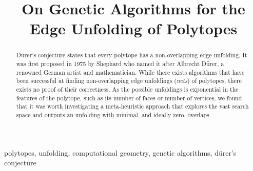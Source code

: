 \documentclass[conference]{IEEEtran}
\renewcommand{\u}{\"{u}}
\begin{document}
\title{On Genetic Algorithms for the Edge Unfolding of Polytopes}

\author{
\and
{}
\and  
{}
}

\maketitle

\begin{abstract}
    D\u rer's conjecture states that every polytope has a non-overlapping edge unfolding. It was first proposed in 1975 by Shephard who named it after Albrecht D\u rer, a renowned German artist and mathematician. While there exists algorithms that have been successful at finding non-overlapping edge unfoldings (\emph{nets}) of polytopes, there exists no proof of their correctness. As the possible unfoldings is exponential in the features of the polytope, such as its number of faces or number of vertices, we found that it was worth investigating a meta-heuristic approach that explores the vast search space and outputs an unfolding with minimal, and ideally zero, overlaps. 
\end{abstract}

\begin{IEEEkeywords}
polytopes, unfolding, computational geometry, genetic algorithms, d\u rer's conjecture
\end{IEEEkeywords}
\end{document}
